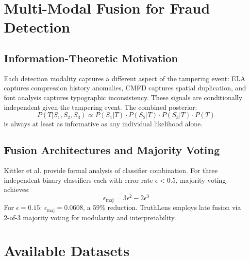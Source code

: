 \documentclass[12pt,a4paper,oneside]{report}
\begin{document}
\section{Multi-Modal Fusion for Fraud Detection}
\label{sec:fusion_lit}

\subsection{Information-Theoretic Motivation}

Each detection modality captures a different aspect of the tampering event:
ELA captures compression history anomalies, CMFD captures spatial duplication,
and font analysis captures typographic inconsistency. These signals are
conditionally independent given the tampering event. The combined posterior:
\[
  P(T | S_1, S_2, S_3) \propto P(S_1 | T) \cdot P(S_2 | T) \cdot P(S_3 | T) \cdot P(T)
\]
is always at least as informative as any individual likelihood alone.

\subsection{Fusion Architectures and Majority Voting}

Kittler et al. \cite{kittler1998} provide formal analysis of classifier combination.
For three independent binary classifiers each with error rate $\epsilon < 0.5$,
majority voting achieves:
\[\epsilon_{\text{maj}} = 3\epsilon^2 - 2\epsilon^3\]
For $\epsilon = 0.15$: $\epsilon_{\text{maj}} = 0.0608$, a 59\% reduction.
TruthLens employs late fusion via 2-of-3 majority voting for modularity and
interpretability.

\section{Available Datasets}
\label{sec:datasets_lit}
\end{document}
